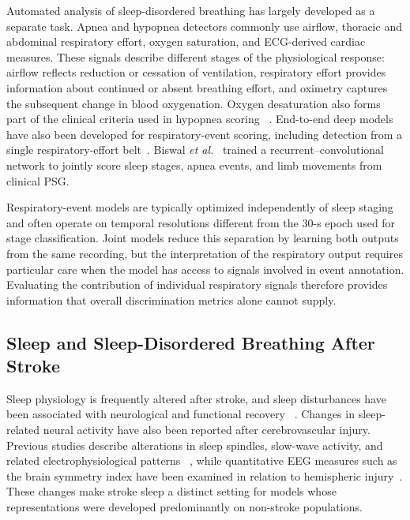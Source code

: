 \documentclass{ieeeaccess}
\begin{document}
Automated analysis of sleep-disordered breathing has largely developed as a
separate task. Apnea and hypopnea detectors commonly use airflow, thoracic and
abdominal respiratory effort, oxygen saturation, and ECG-derived cardiac
measures. These signals describe different stages of the physiological response:
airflow reflects reduction or cessation of ventilation, respiratory effort
provides information about continued or absent breathing effort, and oximetry
captures the subsequent change in blood oxygenation. Oxygen desaturation also
forms part of the clinical criteria used in hypopnea scoring
~\cite{aasm2023manual}. End-to-end deep models have also been developed for
respiratory-event scoring, including detection from a single respiratory-effort
belt~\cite{nassi2022effortbelt}. Biswal \emph{et al.}~\cite{biswal2018expert}
trained a recurrent--convolutional network to jointly score sleep stages, apnea
events, and limb movements from clinical PSG.

Respiratory-event models are typically optimized independently of sleep
staging and often operate on temporal resolutions different from the 30-s epoch
used for stage classification. Joint models reduce this separation by learning
both outputs from the same recording, but the interpretation of the respiratory
output requires particular care when the model has access to signals involved
in event annotation. Evaluating the contribution of individual respiratory
signals therefore provides information that overall discrimination metrics
alone cannot supply.

\subsection{Sleep and Sleep-Disordered Breathing After Stroke}

Sleep physiology is frequently altered after stroke, and sleep disturbances
have been associated with neurological and functional recovery
~\cite{bassetti2006sleep,denis2024sleep,tellenbach2023brainstem}. Changes in
sleep-related neural activity have also been reported after cerebrovascular
injury. Previous studies describe alterations in sleep spindles, slow-wave
activity, and related electrophysiological patterns
~\cite{gottselig2002stroke,fernandez2019spindles,
simpson2023laterality,facchin2020slowwaves,zheng2025spindles}, while
quantitative EEG measures such as the brain symmetry index have been examined
in relation to hemispheric injury~\cite{anastasi2017bsi}. These changes make
stroke sleep a distinct setting for models whose representations were
developed predominantly on non-stroke populations.
\end{document}

